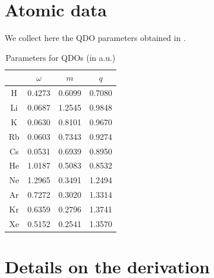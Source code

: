 \documentclass[reprint, amsmath, amssymb, aps, prl]{revtex4-2}
\begin{document}

\newpage

\appendix

\section{Atomic data}

    We collect here the QDO parameters obtained in \cite{PhysRevB.87.144103}.

    \begin{table}[h!]
    \caption{\label{tab:atomic_data} Parameters for QDOs (in a.u.)}
    \begin{ruledtabular}
    \begin{tabular}{c|ccc}
        & $\omega$ & $m$ & $q$ \\
        \hline
        H  & 0.4273 & 0.6099 & 0.7080 \\
        Li & 0.0687 & 1.2545 & 0.9848 \\
        K  & 0.0630 & 0.8101 & 0.9670 \\
        Rb & 0.0603 & 0.7343 & 0.9274 \\
        Cs & 0.0531 & 0.6939 & 0.8950 \\
        He & 1.0187 & 0.5083 & 0.8532 \\
        Ne & 1.2965 & 0.3491 & 1.2494 \\
        Ar & 0.7272 & 0.3020 & 1.3314 \\
        Kr & 0.6359 & 0.2796 & 1.3741 \\
        Xe & 0.5152 & 0.2541 & 1.3570
    \end{tabular}
    \end{ruledtabular}
    \end{table}

\section{Details on the derivation}
\end{document}
